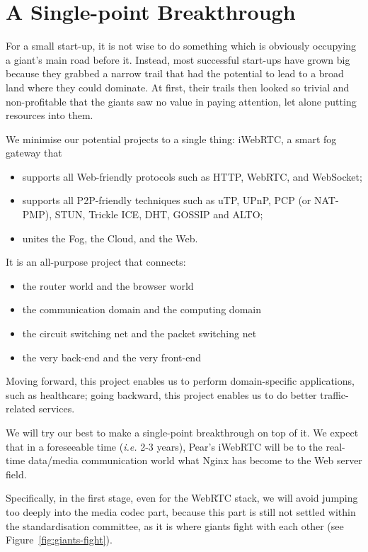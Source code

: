 \section{A Single-point Breakthrough}
For a small start-up, it is not wise to do something which is obviously occupying a giant's main road before it. Instead, most successful start-ups have grown big because they grabbed a narrow trail that had the potential to lead to a broad land where they could dominate. At first, their trails then looked so trivial and non-profitable that the giants saw no value in paying attention, let alone putting resources into them. 

We minimise our potential projects to a single thing: iWebRTC, a smart fog gateway that
\begin{itemize}
	\item supports all Web-friendly protocols such as HTTP, WebRTC, and WebSocket;
	\item supports all P2P-friendly techniques such as uTP, UPnP, PCP (or NAT-PMP), STUN, Trickle ICE, DHT, GOSSIP and ALTO; 
	\item unites the Fog, the Cloud, and the Web. 
\end{itemize} 

It is an all-purpose project that connects: 
\begin{itemize}
	\item the router world and the browser world
	\item the communication domain and the computing domain
	\item the circuit switching net and the packet switching net
	\item the very back-end and the very front-end    
\end{itemize} 

Moving forward, this project enables us to perform domain-specific applications, such as healthcare; going backward, this project enables us to do better traffic-related services. 

We will try our best to make a single-point breakthrough on top of it. We expect that in a foreseeable time ({\em i.e.} 2-3 years), Pear's iWebRTC will be to the real-time data/media communication world what Nginx has become to the Web server field. 

Specifically, in the first stage, even for the WebRTC stack, we will avoid jumping too deeply into the media codec part, because this part is still not settled within the standardisation committee, as it is where giants fight with each other (see Figure~\ref{fig:giants-fight}). 

